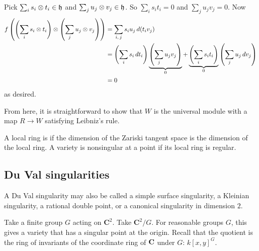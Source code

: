\documentclass [11 pt, oneside, margin = 1 in] {article}
\begin{document}
Pick $\sum_{i}^{} s_i\otimes t_i\in \mathfrak{h}$ and $\sum_{j}^{} u_j\otimes v_j\in \mathfrak{h}$. So $\sum_{i}^{} s_it_i=0$ and $\sum_{j}^{} u_jv_j=0$. Now
\begin{align*}
	f \left( \left( \sum_{i}^{} s_i\otimes t_i \right)\otimes \left( \sum_{j}^{} u_j\otimes v_j \right)  \right)&= \sum_{i,\,j}^{} s_iu_j\, d(t_iv_j) \\
														   &= \left( \sum_{i}^{} s_i\, dt_i \right) \underbrace{\left( \sum_{j}^{} u_jv_j \right)}_{0} + \underbrace{\left( \sum_{i}^{} s_it_i \right)}_{0} \left( \sum_{j}^{} u_j\, dv_j \right) \\
														   &=0
\end{align*}
as desired.

From here, it is straightforward to show that $W$ is the universal module with a map $R\longrightarrow W$ satisfying Leibniz's rule.


\begin{remark}
	A local ring is  if the dimension of the Zariski tangent space is the dimension of the local ring. A variety is nonsingular at a point if its local ring is regular.
\end{remark}

\subsection{Du Val singularities}
A Du Val singularity may also be called a simple surface singularity, a Kleinian singularity, a rational double point, or a canonical singularity in dimension $2$.

Take a finite group $G$ acting on $\mathbf{C}^2$. Take $\mathbf{C}^2/G$. For reasonable groups $G$, this gives a variety that has a singular point at the origin. Recall that the quotient is the ring of invariants of the coordinate ring of $\mathbf C$ under $G$: $k[x,y]^G$. 
\end{document}

